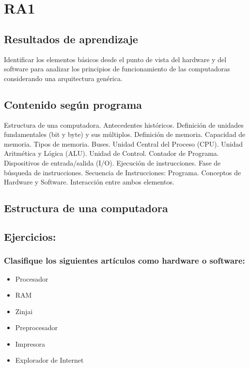 \section{RA1}
\subsection*{Resultados de aprendizaje}
Identificar los elementos básicos desde el punto de vista del hardware y del software para analizar los principios de funcionamiento de las computadoras considerando una arquitectura genérica.

\subsection*{Contenido según programa}
Estructura de una computadora.  Antecedentes históricos.  Definición de unidades fundamentales (bit y byte) y sus múltiplos. Definición de memoria. Capacidad de memoria. Tipos de memoria. Buses. Unidad Central del Proceso (CPU).  Unidad Aritmética y Lógica (ALU). Unidad de Control.  Contador de Programa.  Dispositivos de entrada/salida (I/O).  Ejecución de instrucciones.  Fase de búsqueda de instrucciones. Secuencia de Instrucciones: Programa.  Conceptos de Hardware y Software. Interacción entre ambos elementos.


\subsection*{Estructura de una computadora}

\subsection{Ejercicios:}

\subsubsection{Clasifique los siguientes artículos como hardware o software:}
\begin{itemize}
  \item Procesador
  \item RAM
  \item Zinjai
  \item Preprocesador
  \item Impresora
  \item Explorador de Internet
\end{itemize}

